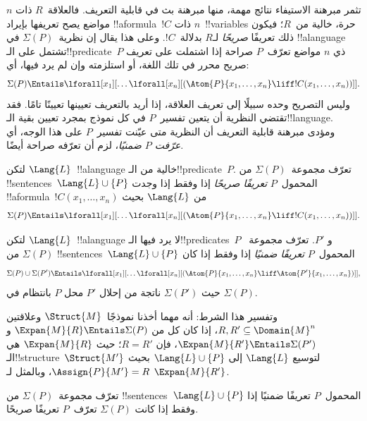 \documentclass[../../../include/open-logic-section]{subfiles}
\begin{document}


تثمر مبرهنة الاستيفاء نتائج مهمة، منها مبرهنة بث في قابلية التعريف.
فالعلاقة~$R$ ذات $n$ مواضع يصح تعريفها بإيراد !!a{formula}~$!C$ ذات
$n$~!!{variable}s حرة، خالية من~$R$؛ فيكون ذلك تعريفًا \emph{صريحًا} لـ$R$
بدلالة~$!C$. وعلى هذا يقال إن نظرية~$\Sigma(P)$ في !!a{language}
تشتمل على الـ!!{predicate}~$P$ ذي $n$ مواضع تعرّف~$P$ صراحة إذا
اشتملت على تعريف صريح محرر في تلك اللغة، أو استلزمته وإن لم يرد فيها، أي:
\[
\Sigma(P) \Entails \lforall[x_1][\dots
  \lforall[x_n][(\Atom{P}{x_1,\dots, x_n} \liff !C(x_1, \dots,
    x_n))]].
\]
وليس التصريح وحده سبيلًا إلى تعريف العلاقة، إذا أريد بالتعريف تعيينها
تعيينًا تامًا. فقد تقتضي النظرية أن يتعين تفسير~$P$ في كل نموذج بمجرد تعيين بقية الـ!!{language}.
ومؤدى مبرهنة قابلية التعريف أن النظرية متى عيّنت تفسير~$P$
على هذا الوجه، أي \emph{عرّفت $P$ ضمنيًا}، لزم أن تعرّفه صراحة أيضًا.

\begin{defn}
لتكن $\Lang{L}$~!!a{language} خالية من الـ!!{predicate}~$P$.
تعرّف مجموعة~$\Sigma(P)$ من !!{sentence}s~$\Lang{L} \cup \{P\}$
المحمول~$P$ \emph{تعريفًا صريحًا} إذا وفقط إذا وجدت
!!a{formula}~$!C(x_1,\dots,x_n)$ من $\Lang{L}$ بحيث
\[
\Sigma(P) \Entails \lforall[x_1][\dots
  \lforall[x_n][(\Atom{P}{x_1,\dots, x_n} \liff !C(x_1, \dots,
    x_n))]].
\]
\end{defn}

\begin{defn}
لتكن $\Lang{L}$~!!a{language} لا يرد فيها الـ!!{predicate}s~$P$ و
$P'$. تعرّف مجموعة~$\Sigma(P)$ من !!{sentence}s~$\Lang{L} \cup \{P\}$
المحمول~$P$ \emph{تعريفًا ضمنيًا} إذا وفقط إذا كان
\[
\Sigma(P) \cup \Sigma(P') \Entails \lforall[x_1][\dots
  \lforall[x_n][(\Atom{P}{x_1,\dots, x_n} \liff \Atom{P'}{x_1,\dots,
      x_n})]],
\]
حيث $\Sigma(P')$ ناتجة من إحلال $P'$ محل $P$ بانتظام في $\Sigma(P)$.
\end{defn}

وتفسير هذا الشرط: أنه مهما أخذنا نموذجًا~$\Struct{M}$ وعلاقتين
$R,R' \subseteq \Domain{M}^n$، إذا كان كل من
$\Expan{M}{R} \Entails \Sigma(P)$ و
$\Expan{M}{R'} \Entails \Sigma(P')$، فإن $R=R'$؛ حيث
$\Expan{M}{R}$ هي الـ!!{structure}~$\Struct{M'}$ لتوسيع $\Lang{L}$
إلى $\Lang{L} \cup \{P\}$ بحيث $\Assign{P}{M'}=R$، وبالمثل لـ
$\Expan{M}{R'}$.

\begin{thm}
تعرّف مجموعة~$\Sigma(P)$ من !!{sentence}s~$\Lang{L} \cup \{P\}$
المحمول~$P$ تعريفًا ضمنيًا إذا وفقط إذا كانت $\Sigma(P)$ تعرّف~$P$
تعريفًا صريحًا.
\end{thm}
\end{document}
